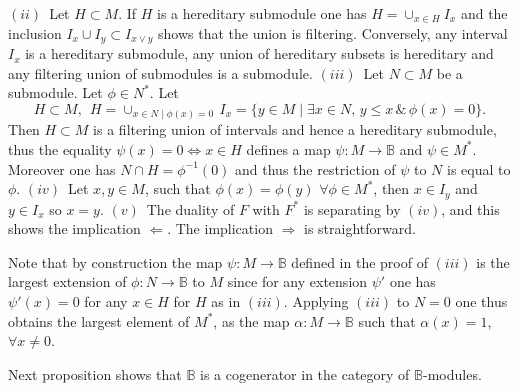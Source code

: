 \documentclass[12pt]{article}
\def\B{{\mathbb B}}
\begin{document}
$(ii)$~Let $H\subset M$. If $H$ is a hereditary submodule one has $H=\cup_{x\in H} I_x$ and the inclusion $I_x\cup I_y\subset I_{x\vee y}$ shows that the union is filtering. Conversely, any interval $I_x$ is a hereditary submodule, any union of hereditary subsets is hereditary and any filtering union of submodules is a submodule. \newline
$(iii)$~Let $N\subset M$ be a submodule. Let $\phi\in N^*$. Let $$
H\subset M,\ \ H=\cup_{x\in N\mid \phi(x)=0} \, I_x=\{y\in M\mid \exists x\in N,\, y\leq x\,\&\, \phi(x)=0\}.
$$
Then $H\subset M$ is a filtering union of intervals and hence a hereditary submodule, thus 
 the equality $\psi(x)=0 \iff x\in H$ defines a map $\psi:M\to \B$ and $\psi\in M^*$. Moreover one has $N\cap H=\phi^{-1}(0)$ and thus the restriction of $\psi$ to $N$ is equal to $\phi$.\newline
$(iv)$~Let $x,y\in M$, such that $\phi(x)=\phi(y)$ $\forall\phi\in M^*$, then $x\in I_y$ and $y\in I_x$ so $x=y$. \newline
$(v)$~The duality of $F$ with $F^*$ is separating by  $(iv)$, and this shows the implication $\Leftarrow$. The implication $\Rightarrow$ is straightforward.\endproof

Note that by construction the map $\psi: M\to \B$ defined in the proof of $(iii)$ is the largest extension of $\phi: N\to \B$ to $M$ since for any extension $\psi'$ one has $\psi'(x)=0$ for any $x\in H$ for $H$ as in $(iii)$. Applying $(iii)$ to $N=0$ one thus obtains the largest element of $M^*$, as the map $\alpha:M\to \B$ such that $\alpha(x)=1$, $\forall x\neq 0$.\vspace{.05in}

Next proposition shows that $\B$ is a cogenerator in the category of $\B$-modules.
\end{document}

